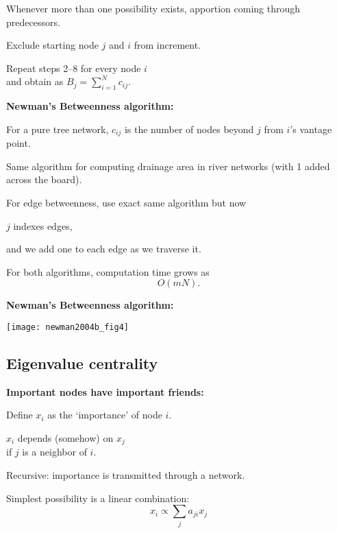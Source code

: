     Whenever more than one possibility exists,
    apportion 
    coming through predecessors.
  
    Exclude starting node $j$ and $i$ from increment.
  
    Repeat steps 2--8 for every node $i$\\ 
    and obtain
     as 
    \alert{$ B_j = \sum_{i=1}^N c_{ij}. $}
  


  \textbf{Newman's Betweenness algorithm:\cite{newman2001d}}

  
   
    For a \alert{pure tree network}, $c_{ij}$ is the
    number of nodes beyond $j$ from $i$'s vantage point.
   
    Same algorithm for computing drainage area in
    river networks (with 1 added across the board).
   
    For \alert{edge betweenness}, use exact same
    algorithm but now 
    
     
      $j$ indexes edges,
     
      and we add one to each edge as we traverse it.
    
   
    For both algorithms, computation
    time grows as 
    $$O (mN). $$
  
  

  \textbf{Newman's Betweenness algorithm:\cite{newman2001d}}

  \texttt{[image: newman2004b\_fig4]}
  

\subsection{Eigenvalue centrality}

  \textbf{Important nodes have important friends:}

  
   
    Define $x_i$ as the `importance' of node $i$.
   
     $x_i$ depends (somehow) on $x_j$\\
    \qquad if $j$ is a neighbor of $i$.
   
    \alert{Recursive:} importance is transmitted
    through a network.
   
    Simplest possibility is a linear combination:
    $$
    x_i \propto \sum_{j} a_{ji} x_j
    $$
   
